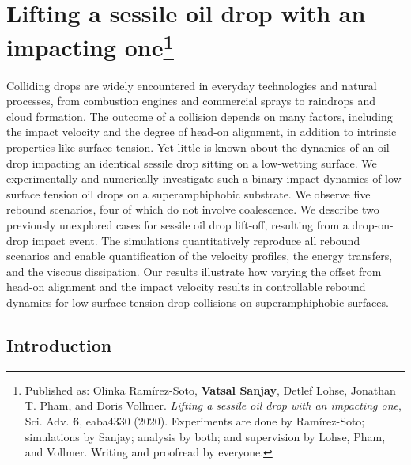 \chapter[Lifting a sessile oil drop with an impacting one]{Lifting a sessile oil drop with an impacting one\footnote{Published as: Olinka Ram{\'i}rez-Soto, \textbf{Vatsal Sanjay}, Detlef Lohse, Jonathan T. Pham, and Doris Vollmer. \textit{Lifting a sessile oil drop with an impacting one}, Sci. Adv. \textbf{6}, eaba4330 (2020). Experiments are done by Ram{\'i}rez-Soto; simulations by Sanjay; analysis by both; and supervision by Lohse, Pham, and Vollmer. Writing and proofread by everyone.}}
\label{chap:DropOnDrop}

Colliding drops are widely encountered in everyday technologies and natural processes, from combustion engines and commercial sprays to raindrops and cloud formation. The outcome of a collision depends on many factors, including the impact velocity and the degree of head-on alignment, in addition to intrinsic properties like surface tension. Yet little is known about the dynamics of an oil drop impacting an identical sessile drop sitting on a low-wetting surface. We experimentally and numerically investigate such a binary impact dynamics of low surface tension oil drops on a superamphiphobic substrate. We observe five rebound scenarios, four of which do not involve coalescence. We describe two previously unexplored cases for sessile oil drop lift-off, resulting from a drop-on-drop impact event. The simulations quantitatively reproduce all rebound scenarios and enable quantification of the velocity profiles, the energy transfers, and the viscous dissipation. Our results illustrate how varying the offset from head-on alignment and the impact velocity results in controllable rebound dynamics for low surface tension drop collisions on superamphiphobic surfaces. 

\clearpage

\section{Introduction}\label{Ch5:Introduction}


